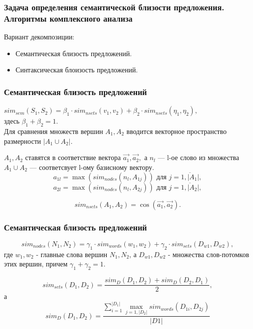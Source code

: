 \documentclass{beamer}
\begin{document}
\begin{frame}
\frametitle{Задача определения семантической близости предложения. Алгоритмы комплексного анализа}

Вариант декомпозиции:
\begin{itemize}
\item{
Семантическая близость предложений.
}
\item{
Синтаксическая блоизость предложений.
}
\end{itemize}

\end{frame}

\begin{frame}
\frametitle{Семантическая близость предложений}


$sim_{sem}(S_1 , S_2) = \beta_1 \cdot sim_{nsets}(v_1, v_2) + \beta_2 \cdot sim_{nsets}(\eta_1, \eta_2), $\\
здесь 
$\beta_1 + \beta_2 = 1$.\\
\vspace{0.5cm}
Для сравнения множеств вершин $A_1,A_2$ вводится векторное пространство размерности $|A_1 \cup A_2|$.

$A_1,A_2$ ставятся в соответствие вектора $\vec{a_1},\vec{a_2}, $ 
а $n_l$ --- l-ое слово из множества $A_1 \cup A_2$ --- соответсвует l-ому базисному вектору.
$$a_{1l} = \max(sim_{nodes}(n_l, A_{1j})) \text{ для } j=\overline{1,|A_1|},$$
$$a_{2l} = \max(sim_{nodes}(n_l, A_{2j})) \text{ для } j=\overline{1,|A_2|},$$

$$ sim_{nsets}(A_1,A_2) = \cos\left(\vec{a_1},\vec{a_2}\right). $$



\end{frame}

\begin{frame}
\frametitle{Семантическая близость предложений}

$$ sim_{nodes}(N_1, N_2) = \gamma_1 \cdot sim_{words}(w_1,w_2) + \gamma_2 \cdot sim_{sets}(D_{w1}, D_{w2}), $$
где $w_1, w_2$ - главные слова вершин $N_1, N_2$, а $D_{w1}, D_{w2}$ - множества слов-потомков этих вершин,
причем $\gamma_1+\gamma_2=1$.

$$sim_{sets}(D_1, D_2) = \frac{sim_{D}(D_1,D_2) + sim_{D}(D_2, D_1)}{2}, $$
а 
$$sim_{D}(D_1, D_2) = \frac{ \sum \limits_{i=1}^{|D_1|} \max_{j=1,|D_2|} sim_{words}(D_{1i}, D_{2j}) } { |D1| }$$

\end{frame}
\end{document}
